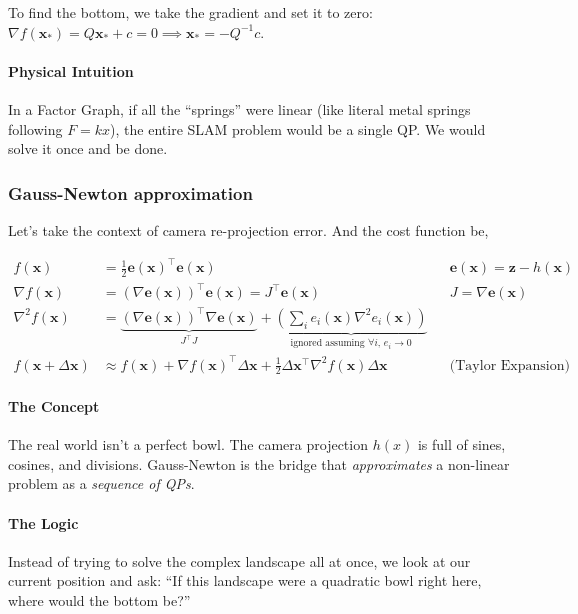 \documentclass[11pt]{article}
\begin{document}
To find the bottom, we take the gradient and set it to
zero: \(\nabla f(\mathbf{x}_*) = Q\mathbf{x}_* + c = 0
\implies \mathbf{x}_* = -Q^{-1}c\).
\paragraph*{Physical Intuition}
\label{sec:org619b72e}

In a Factor Graph, if all the ``springs'' were linear
(like literal metal springs following \(F=kx\)), the
entire SLAM problem would be a single QP.  We would
solve it once and be done.
\subsubsection{Gauss-Newton approximation}
\label{sec:orgeb2e891}

Let's take the context of camera re-projection error.
And the cost function be,

\begin{align*}
  f(\mathbf{x})
  &= \frac12 \mathbf{e}(\mathbf{x})^{\top}
    \mathbf{e}(\mathbf{x}) 
  && \mathbf{e}(\mathbf{x}) = \mathbf{z} -
     h(\mathbf{x})
  \\
  \nabla f(\mathbf{x})
  &= \left( \nabla \mathbf{e}(\mathbf{x}) \right)^{\top}
    \mathbf{e}(\mathbf{x}) = J^{\top}\mathbf{e}(\mathbf{x})
  && J = \nabla \mathbf{e}(\mathbf{x})
  \\
  \nabla^2 f(\mathbf{x})
  &= \underbrace{\left( \nabla \mathbf{e}(\mathbf{x})
    \right)^{\top} \nabla \mathbf{e}(\mathbf{x})}
    _{J^{\top}J} + \underbrace{ \left(\sum_i
    e_i(\mathbf{x}) \nabla^2e_i(\mathbf{x}) \right) }
    _{\text{ignored assuming } \forall i,\, e_i \to 0}
  \\
  f(\mathbf{x} + \Delta\mathbf{x})
  &\approx f(\mathbf{x}) + \nabla f(\mathbf{x})^{\top}
    \Delta \mathbf{x} + \frac12 \Delta
    \mathbf{x}^{\top} \nabla^2f(\mathbf{x}) \Delta
    \mathbf{x}
  && \text{(Taylor Expansion)}
\end{align*}
\paragraph*{The Concept}
\label{sec:orga27afaf}
The real world isn't a perfect bowl. The camera
projection \(h(x)\) is full of sines, cosines, and
divisions.  Gauss-Newton is the bridge that
\emph{approximates} a non-linear problem as a \emph{sequence of
QPs}.
\paragraph*{The Logic}
\label{sec:orgdcc816d}
Instead of trying to solve the complex landscape all at
once, we look at our current position and ask: ``If this
landscape were a quadratic bowl right here, where would
the bottom be?''
\end{document}
